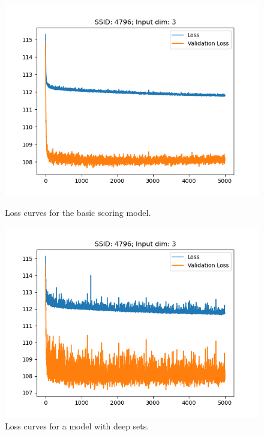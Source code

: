 \documentclass[12pt, twoside, ngerman]{report}
\begin{document}
\begin{figure}[h]%
\centering
\begin{minipage}{0.45\textwidth}
\includegraphics[width=\textwidth]{images/loss4796BasicScoringModel}
\caption{Loss curves for the basic scoring model.}
    \label{fig:loss4796BasicScoringModel}
\end{minipage}\hfill
\begin{minipage}{0.45\textwidth}
\includegraphics[width=\textwidth]{images/loss4796DeepSets}
\caption{Loss curves for a model with deep sets.}
    \label{fig:loss4796DeepSets}
\end{minipage}
\end{figure}
\end{document}
